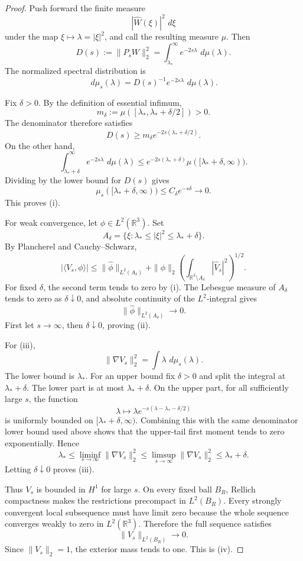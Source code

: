 \documentclass[11pt]{article}
\theoremstyle{definition}\newtheorem{problem}[theorem]{Problem}
\theoremstyle{definition}
\theoremstyle{remark}
\newcommand{\R}{\mathbb R}
\newcommand{\dd}{\,d}
\begin{document}
\begin{proof}
Push forward the finite measure
\[
 |\widehat W(\xi)|^2\,\dd\xi
\]
under the map \(\xi\mapsto\lambda=|\xi|^2\), and call the resulting measure
\(\mu\).  Then
\[
 D(s):=\|P_sW\|_2^2
 =\int_{\lambda_*}^{\infty}e^{-2s\lambda}\,\dd\mu(\lambda).
\]
The normalized spectral distribution is
\[
 \dd\mu_s(\lambda)
 =
 D(s)^{-1}e^{-2s\lambda}\,\dd\mu(\lambda).
\]

Fix \(\delta>0\).  By the definition of essential infimum,
\[
 m_\delta:=
 \mu([\lambda_*,\lambda_*+\delta/2])>0.
\]
The denominator therefore satisfies
\[
 D(s)\ge
 m_\delta e^{-2s(\lambda_*+\delta/2)}.
\]
On the other hand,
\[
 \int_{\lambda_*+\delta}^{\infty}e^{-2s\lambda}\,\dd\mu(\lambda)
 \le
 e^{-2s(\lambda_*+\delta)}\mu([\lambda_*+\delta,\infty)).
\]
Dividing by the lower bound for \(D(s)\) gives
\[
 \mu_s([\lambda_*+\delta,\infty))
 \le C_\delta e^{-s\delta}\longrightarrow0.
\]
This proves (i).

For weak convergence, let \(\phi\in L^2(\R^3)\).  Set
\[
 A_\delta=
 \{\xi:\lambda_*\le|\xi|^2\le\lambda_*+\delta\}.
\]
By Plancherel and Cauchy--Schwarz,
\[
 |\langle V_s,\phi\rangle|
 \le
 \|\widehat\phi\|_{L^2(A_\delta)}
 +
 \|\phi\|_2
 \left(
 \int_{\R^3\setminus A_\delta}|\widehat V_s|^2
 \right)^{1/2}.
\]
For fixed \(\delta\), the second term tends to zero by (i).  The Lebesgue
measure of \(A_\delta\) tends to zero as \(\delta\downarrow0\), and absolute
continuity of the \(L^2\)-integral gives
\[
 \|\widehat\phi\|_{L^2(A_\delta)}\longrightarrow0.
\]
First let \(s\to\infty\), then \(\delta\downarrow0\), proving (ii).

For (iii),
\[
 \|\nabla V_s\|_2^2
 =
 \int\lambda\,\dd\mu_s(\lambda).
\]
The lower bound is \(\lambda_*\).  For an upper bound fix \(\delta>0\) and
split the integral at \(\lambda_*+\delta\).  The lower part is at most
\(\lambda_*+\delta\).  On the upper part, for all sufficiently large \(s\),
the function
\[
 \lambda\longmapsto
 \lambda e^{-s(\lambda-\lambda_*-\delta/2)}
\]
is uniformly bounded on \([\lambda_*+\delta,\infty)\).  Combining this with
the same denominator lower bound used above shows that the upper-tail first
moment tends to zero exponentially.  Hence
\[
 \lambda_*
 \le\liminf_{s\to\infty}\|\nabla V_s\|_2^2
 \le\limsup_{s\to\infty}\|\nabla V_s\|_2^2
 \le\lambda_*+\delta.
\]
Letting \(\delta\downarrow0\) proves (iii).

Thus \(V_s\) is bounded in \(H^1\) for large \(s\).  On every fixed ball
\(B_R\), Rellich compactness makes the restrictions precompact in \(L^2(B_R)\).
Every strongly convergent local subsequence must have limit zero because the
whole sequence converges weakly to zero in \(L^2(\R^3)\).  Therefore the full
sequence satisfies
\[
 \|V_s\|_{L^2(B_R)}\to0.
\]
Since \(\|V_s\|_2=1\), the exterior mass tends to one.  This is (iv).


\end{proof}
\end{document}
